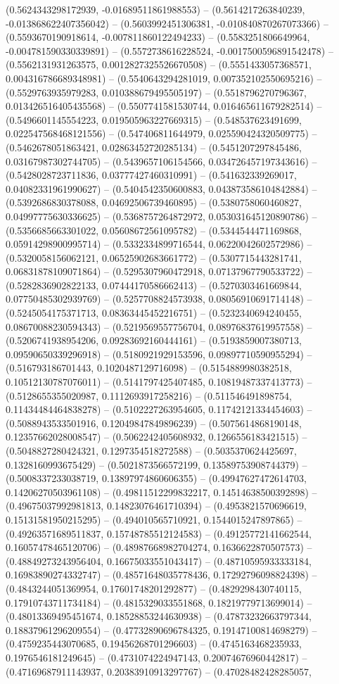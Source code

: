 (0.5624343298172939, -0.01689511861988553) -- (0.5614217263840239, -0.013868622407356042) -- (0.5603992451306381, -0.010840870267073366) -- (0.5593670190918614, -0.007811860122494233) -- (0.5583251806649964, -0.004781590330339891) -- (0.5572738616228524, -0.0017500596891542478) -- (0.5562131931263575, 0.0012827325526670508) -- (0.5551433057368571, 0.004316786689348981) -- (0.5540643294281019, 0.007352102550695216) -- (0.5529763935979283, 0.010388679495505197) -- (0.5518796270796367, 0.013426516405435568) -- (0.5507741581530744, 0.016465611679282514) -- (0.5496601145554223, 0.019505963227669315) -- (0.548537623491699, 0.022547568468121556) -- (0.547406811644979, 0.025590424320509775) -- (0.5462678051863421, 0.02863452720285134) -- (0.5451207297845486, 0.03167987302744705) -- (0.5439657106154566, 0.034726457197343616) -- (0.5428028723711836, 0.03777427460310991) -- (0.541632339269017, 0.04082331961990627) -- (0.5404542350600883, 0.043873586104842884) -- (0.5392686830378088, 0.04692506739460895) -- (0.5380758060460827, 0.04997775630336625) -- (0.5368757264872972, 0.053031645120890786) -- (0.5356685663301022, 0.05608672561095782) -- (0.5344544471169868, 0.05914298900995714) -- (0.5332334899716544, 0.06220042602572986) -- (0.5320058156062121, 0.06525902683661772) -- (0.5307715443281741, 0.06831878109071864) -- (0.5295307960472918, 0.07137967790533722) -- (0.5282836902822133, 0.07444170586662413) -- (0.5270303461669844, 0.07750485302939769) -- (0.5257708824573938, 0.08056910691714148) -- (0.5245054175371713, 0.08363445452216751) -- (0.5232340694240455, 0.08670088230594343) -- (0.5219569557756704, 0.08976837619957558) -- (0.5206741938954206, 0.09283692160444161) -- (0.5193859007380713, 0.09590650339296918) -- (0.5180921929153596, 0.09897710590955294) -- (0.516793186701443, 0.1020487129716098) -- (0.5154889980382518, 0.10512130787076011) -- (0.5141797425407485, 0.10819487337413773) -- (0.5128655355020987, 0.1112693917258216) -- (0.511546491898754, 0.11434484464838278) -- (0.5102227263954605, 0.11742121334454603) -- (0.5088943533501916, 0.12049847849896239) -- (0.5075614868190148, 0.12357662028008547) -- (0.5062242405608932, 0.1266556183421515) -- (0.5048827280424321, 0.1297354518272588) -- (0.5035370624425697, 0.1328160993675429) -- (0.5021873566572199, 0.13589753908744379) -- (0.5008337233038719, 0.13897974860606355) -- (0.49947627472614703, 0.14206270503961108) -- (0.49811512299832217, 0.14514638500392898) -- (0.49675037992981813, 0.14823076461710394) -- (0.4953821570696619, 0.15131581950215295) -- (0.494010565710921, 0.1544015247897865) -- (0.49263571689511837, 0.15748785512124583) -- (0.49125772141662544, 0.16057478465120706) -- (0.48987668982704274, 0.1636622870507573) -- (0.48849273243956404, 0.16675033551043417) -- (0.48710595933333184, 0.16983890274332747) -- (0.48571648035778436, 0.17292796098824398) -- (0.4843244051369954, 0.17601748201292877) -- (0.4829298430740115, 0.17910743711734184) -- (0.4815329033551868, 0.18219779713699014) -- (0.48013369495451674, 0.18528853244630938) -- (0.47873232663797344, 0.18837961296209554) -- (0.47732890696784325, 0.19147100814698279) -- (0.4759235443070685, 0.19456268701296603) -- (0.4745163468235933, 0.1976546181249645) -- (0.4731074224947143, 0.20074676960442817) -- (0.47169687911143937, 0.20383910913297767) -- (0.47028482428285057, 